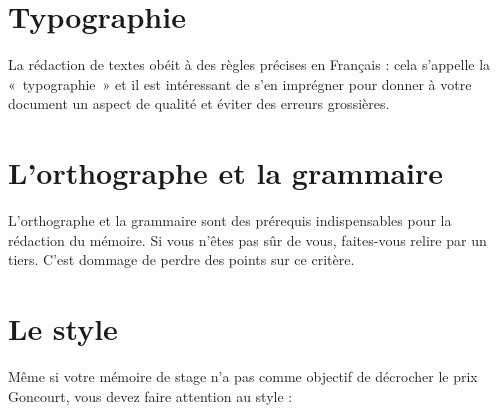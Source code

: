 \documentclass [twoside,openright,a4paper,11pt,french] {report}
\begin{document}
\section {Typographie}

La rédaction de textes obéit à des règles précises en
Français : cela s'appelle la «~typographie~» \cite{andre1990} et il
est intéressant de s'en imprégner pour donner à votre document un
aspect de qualité et éviter des erreurs grossières.

\section {L'orthographe et la grammaire}

L'orthographe et la grammaire sont des prérequis indispensables pour
la rédaction du mémoire. Si vous n'êtes pas sûr de vous, faites-vous
relire par un tiers. C'est dommage de perdre des points sur ce critère.

\section {Le style}

Même si votre mémoire de stage n'a pas comme objectif de décrocher
le prix Goncourt, vous devez faire attention au style :
\end{document}
